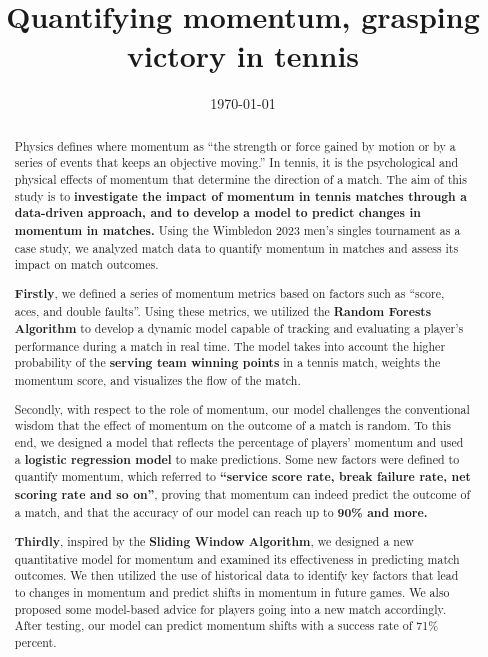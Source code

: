 \documentclass{mcmthesis}
\title{{\bf Quantifying momentum, grasping victory in tennis}}
\date{\today}
\begin{document}
\begin{abstract}

    Physics defines where momentum as “the strength or force gained by motion or by a series of
    events that keeps an objective moving.” In tennis, it is the psychological and physical effects of
    momentum that determine the direction of a match. The aim of this study is to {\bf investigate the
    impact of momentum in tennis matches through a data-driven approach, and to develop a
    model to predict changes in momentum in matches.} Using the Wimbledon 2023 men's singles
    tournament as a case study, we analyzed match data to quantify momentum in matches and assess
    its impact on match outcomes.\par
     {\bf Firstly}, we defined a series of momentum metrics based on factors such as “score, aces, and
    double faults”. Using these metrics, we utilized the {\bf Random Forests Algorithm} to develop a
    dynamic model capable of tracking and evaluating a player's performance during a match in real
    time. The model takes into account the higher probability of the {\bf serving team winning points} in a
    tennis match, weights the momentum score, and visualizes the flow of the match.\par
    Secondly, with respect to the role of momentum, our model challenges the conventional
    wisdom that the effect of momentum on the outcome of a match is random. To this end, we
    designed a model that reflects the percentage of players' momentum and used a {\bf logistic regression
    model} to make predictions. Some new factors were defined to quantify momentum, which
    referred to {\bf “service score rate, break failure rate, net scoring rate and so on”}, proving that
    momentum can indeed predict the outcome of a match, and that the accuracy of our model can
    reach up to {\bf 90\% and more.} \par
     {\bf Thirdly}, inspired by the {\bf Sliding Window Algorithm}, we designed a new quantitative model
    for momentum and examined its effectiveness in predicting match outcomes. We then utilized the
    use of historical data to identify key factors that lead to changes in momentum and predict shifts in
    momentum in future games. We also proposed some model-based advice for players going into a
    new match accordingly. After testing, our model can predict momentum shifts with a success rate
    of 71\% percent.\par

\end{abstract}
\end{document}
